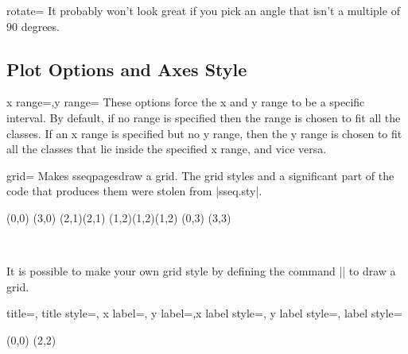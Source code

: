 \documentclass{ltxdoc}
\def\sseqpages{sseqpages}
\begin{document}
\begin{sseqdata}[name=ex1,degree={#1}{1-#1}]
\begin{key}{rotate=}
It probably won't look great if you pick an angle that isn't a multiple of 90 degrees.
\end{key}

\subsection{Plot Options and Axes Style}
\begin{keylist}{x range=,y range=}
These options force the x and y range to be a specific interval. By default, if no range is specified then the range is chosen to fit all the classes. If an x range is specified but no y range, then the y range is chosen to fit all the classes that lie inside the specified x range, and vice versa.
\end{keylist}

\begin{key}{grid=}
Makes \sseqpages\space draw a grid. The grid styles and a significant part of the code that produces them were stolen from |sseq.sty|.
\begin{codeexample}[]
\begin{sseqdata}[name=grid example,scale=0.9]
\class(0,0)
\class(3,0)
\class(2,1)\class(2,1)
\class(1,2)\class(1,2)\class(1,2)
\class(0,3)
\class(3,3)
\end{sseqdata}
\vbox{
\hbox{
\printpage[name=grid example,grid=chess]
\qquad
\printpage[name=grid example,grid=crossword]
\qquad
\printpage[name=grid example,grid=dots]
}
\vskip30pt
\hbox{
\printpage[name=grid example,grid=go]
\qquad
\printpage[name=grid example,grid=none]
}
}
\end{codeexample}
It is possible to make your own grid style by defining the command |\sseq@grid@yourgridname| to draw a grid.
\end{key}

\begin{keylist}{title=, title style=, x label=, y label=,x label style=, y label style=, label style=}
\begin{codeexample}[width=6cm]
\begin{sseqpage}[title={An example},
    x label={x axis label}, y label={y axis label},
    label style={blue,font=\small},
    x label style={yshift=10pt},y label style={xshift=10pt}]
\class(0,0)
\class(2,2)
\end{sseqpage}
\end{codeexample}
\end{keylist}



\end{sseqdata}
\end{document}
